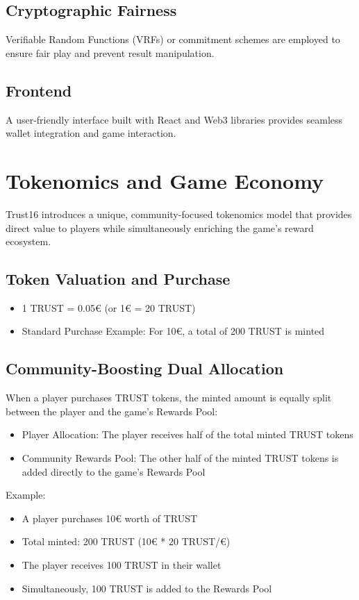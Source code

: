 \documentclass[12pt,a4paper]{article}
\begin{document}
\subsection{Cryptographic Fairness}
Verifiable Random Functions (VRFs) or commitment schemes are employed to ensure fair play and prevent result manipulation.

\subsection{Frontend}
A user-friendly interface built with React and Web3 libraries provides seamless wallet integration and game interaction.

\section{Tokenomics and Game Economy}

Trust16 introduces a unique, community-focused tokenomics model that provides direct value to players while simultaneously enriching the game's reward ecosystem.

\subsection{Token Valuation and Purchase}
\begin{itemize}
    \item 1 TRUST = 0.05€ (or 1€ = 20 TRUST)
    \item Standard Purchase Example: For 10€, a total of 200 TRUST is minted
\end{itemize}

\subsection{Community-Boosting Dual Allocation}
When a player purchases TRUST tokens, the minted amount is equally split between the player and the game's Rewards Pool:
\begin{itemize}
    \item Player Allocation: The player receives half of the total minted TRUST tokens
    \item Community Rewards Pool: The other half of the minted TRUST tokens is added directly to the game's Rewards Pool
\end{itemize}

Example:
\begin{itemize}
    \item A player purchases 10€ worth of TRUST
    \item Total minted: 200 TRUST (10€ * 20 TRUST/€)
    \item The player receives 100 TRUST in their wallet
    \item Simultaneously, 100 TRUST is added to the Rewards Pool
\end{itemize}
\end{document}
